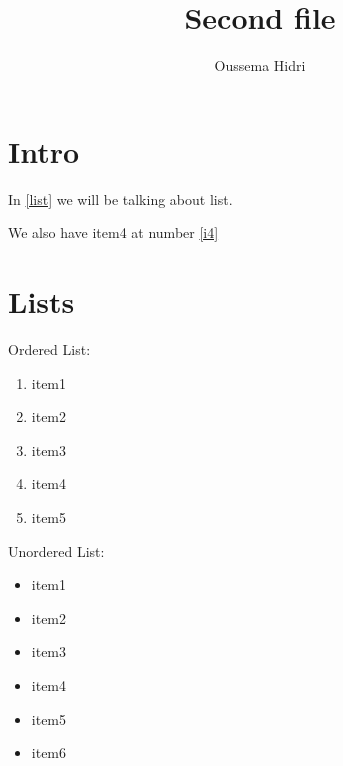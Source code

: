 \documentclass{article}
\author{Oussema Hidri}
\title{Second file}
\begin{document}
\maketitle


\section{Intro}

In \ref{list} we will be talking about list.

We also have item4 at number \ref{i4}

\section{Lists\label{list}}


Ordered List:

\begin{enumerate}
\item item1
\item item2
\item item3
\item item4\label{i4}
\item item5
\end{enumerate}



Unordered List:

\begin{itemize}
\item item1
\item item2
\item item3
\item item4
\item item5
\item item6
\end{itemize}
\end{document}
